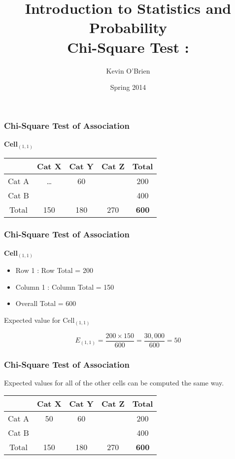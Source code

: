\documentclass[a4]{beamer}
\title[Stats-Lab.com]{\LARGE Introduction to Statistics and Probability \\ {\Large Chi-Square Test : }}
\author[Kevin O'Brien]{Kevin O'Brien}
\date{Spring 2014}
\begin{document}
\begin{frame}
\titlepage
\end{frame}

\begin{frame}
	\frametitle{Chi-Square Test of Association}
	
	\Large
	\textbf{Cell$_{(1,1)}$}
	\begin{center}
		\begin{tabular}{|c|c|c|c|c|}
			\hline & Cat X & Cat Y & Cat Z & Total  \\ \hline
			Cat A & \alert{\ldots}& 60 &  & 200\\ \hline
			Cat B & \phantom{space}& \phantom{space} & \phantom{space} & 400 \\ \hline
			Total & 150 & 180 & 270 &  \textbf{600}\\ \hline
			
		\end{tabular} 
	\end{center}
	
\end{frame}

\begin{frame}
	\frametitle{Chi-Square Test of Association}
	\Large
	\textbf{Cell$_{(1,1)}$}
	\begin{itemize}
		\item Row 1 : Row Total = 200
		\item Column 1 : Column Total = 150
		\item Overall Total = 600
	\end{itemize}
	\bigskip
	
	
	Expected value for Cell$_{(1,1)}$
	
	\[ E_{(1,1)} = \frac{200 \times 150}{600} = \frac{30,000}{600} = 50 \]
\end{frame}
\begin{frame}
	\frametitle{Chi-Square Test of Association}
	
	\Large
	Expected values for all of the other cells can be computed the same way.
	\begin{center}
		\begin{tabular}{|c|c|c|c|c|}
			\hline & Cat X & Cat Y & Cat Z & Total  \\ \hline
			Cat A & 50 & 60 &  & 200\\ \hline
			Cat B & \phantom{space}& \phantom{space} & \phantom{space} & 400 \\ \hline
			Total & 150 & 180 & 270 &  \textbf{600}\\ \hline
			
		\end{tabular} 
	\end{center}
	
	
\end{frame}
\end{document}
